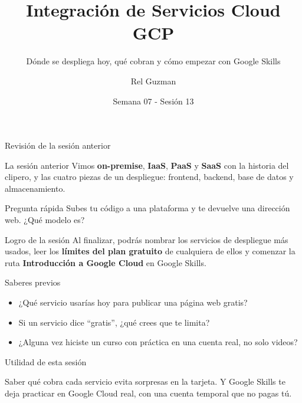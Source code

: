 \documentclass[aspectratio=169,10pt,c]{beamer}
\title{Integración de Servicios Cloud GCP}
\subtitle{Dónde se despliega hoy, qué cobran y cómo empezar con Google Skills}
\date{Semana 07 - Sesión 13}
\author{Rel Guzman}
\begin{document}
{\maketitle}

\begin{frame}[c]{Revisión de la sesión anterior}
\begin{block}{La sesión anterior}
\small Vimos \textbf{on-premise}, \textbf{IaaS}, \textbf{PaaS} y \textbf{SaaS} con la historia del clipero, y las cuatro piezas de un despliegue: frontend, backend, base de datos y almacenamiento.
\end{block}
\begin{alertblock}{Pregunta rápida}
\small Subes tu código a una plataforma y te devuelve una dirección web. ¿Qué modelo es?
\end{alertblock}
\end{frame}

\begin{frame}[c]
\begin{block}{Logro de la sesión}
Al finalizar, podrás nombrar los servicios de despliegue más usados, leer los \textbf{límites del plan gratuito} de cualquiera de ellos y comenzar la ruta \textbf{Introducción a Google Cloud} en Google Skills.
\end{block}
\end{frame}

\begin{frame}{Saberes previos}
\begin{itemize}\setlength\itemsep{10pt}
  \item ¿Qué servicio usarías hoy para publicar una página web gratis?
  \item Si un servicio dice ``gratis'', ¿qué crees que te limita?
  \item ¿Alguna vez hiciste un curso con práctica en una cuenta real, no solo videos?
\end{itemize}
\end{frame}

\begin{frame}[c]{Utilidad de esta sesión}
\begin{center}
\begin{minipage}{.86\textwidth}
{\large Saber qué cobra cada servicio evita sorpresas en la tarjeta. Y Google Skills te deja practicar en Google Cloud real, con una cuenta temporal que no pagas tú.}
\end{minipage}
\end{center}
\end{frame}
\end{document}
